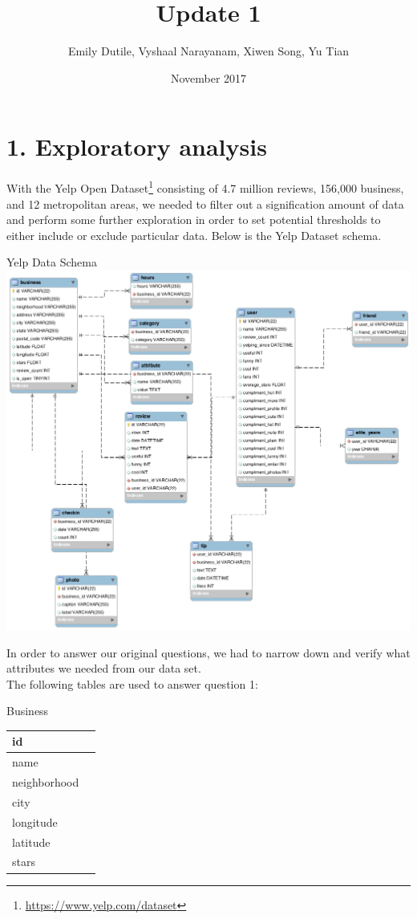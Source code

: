 \documentclass{neu_handout}
\title{Update 1}
\author{Emily Dutile, Vyshaal Narayanam, Xiwen Song, Yu Tian}
\date{November 2017}
\begin{document}
\section*{1. Exploratory analysis}
With the Yelp Open Dataset\footnote{\url{https://www.yelp.com/dataset}} consisting of 4.7 million reviews, 156,000 business, and 12 metropolitan areas, we needed to filter out a signification amount of data and perform some further exploration in order to set potential thresholds to either include or exclude particular data. Below is the Yelp Dataset schema.

\begin{center}
Yelp Data Schema\\
\includegraphics[width=150mm,scale=0.5]{schema}\\
\end{center}

In order to answer our original questions, we had to narrow down and verify what attributes we needed from our data set.\\

The following tables are used to answer question 1:\\

\begin{center}
Business\\
\begin{tabular}{|l|l|}
\hline
id  \\ \hline
name  \\ \hline
neighborhood  \\ \hline
city  \\ \hline
longitude  \\ \hline
latitude  \\ \hline
stars  \\ \hline
\end{tabular}
\end{center}
\end{document}
